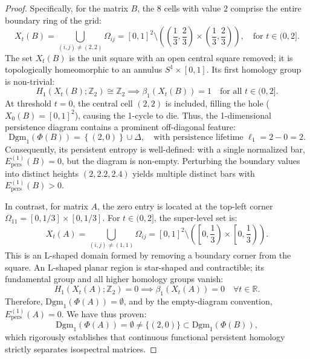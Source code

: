 \documentclass[11pt,a4paper,reqno]{amsart}
\theoremstyle{definition}
\numberwithin{equation}{section}
\newcommand{\R}{\mathbb{R}}
\begin{document}
\begin{proof}
Specifically, for the matrix $B$, the $8$ cells with value $2$ comprise the entire boundary ring of the grid:
\begin{equation}
    X_t(B) = \bigcup_{(i,j) \ne (2,2)} \Omega_{ij} = [0, 1]^2 \setminus \left( \left(\frac{1}{3}, \frac{2}{3}\right) \times \left(\frac{1}{3}, \frac{2}{3}\right) \right), \quad \text{for } t \in (0, 2].
\end{equation}
The set $X_t(B)$ is the unit square with an open central square removed; it is topologically homeomorphic to an annulus $S^1 \times [0, 1]$. Its first homology group is non-trivial:
\begin{equation}
    H_1(X_t(B); \mathbb{Z}_2) \cong \mathbb{Z}_2 \implies \beta_1(X_t(B)) = 1 \quad \text{for all } t \in (0, 2].
\end{equation}
At threshold $t = 0$, the central cell $(2,2)$ is included, filling the hole ($X_0(B) = [0,1]^2$), causing the 1-cycle to die.
Thus, the 1-dimensional persistence diagram contains a prominent off-diagonal feature:
\begin{equation}
    \mathrm{Dgm}_1(\Phi(B)) = \left\{ (2, 0) \right\} \cup \Delta, \quad \text{with persistence lifetime } \ell_1 = 2 - 0 = 2.
\end{equation}
Consequently, its persistent entropy is well-defined: with a single normalized bar, $E_{\mathrm{pers}}^{(1)}(B) = 0$, but the diagram is non-empty. Perturbing the boundary values into distinct heights $(2, 2.2, 2.4)$ yields multiple distinct bars with $E_{\mathrm{pers}}^{(1)}(B) > 0$.

In contrast, for matrix $A$, the zero entry is located at the top-left corner $\Omega_{11} = [0, 1/3] \times [0, 1/3]$. For $t \in (0, 2]$, the super-level set is:
\begin{equation}
    X_t(A) = \bigcup_{(i,j) \ne (1,1)} \Omega_{ij} = [0, 1]^2 \setminus \left( \left[0, \frac{1}{3}\right) \times \left[0, \frac{1}{3}\right) \right).
\end{equation}
This is an L-shaped domain formed by removing a boundary corner from the square. An L-shaped planar region is star-shaped and contractible; its fundamental group and all higher homology groups vanish:
\begin{equation}
    H_1(X_t(A); \mathbb{Z}_2) = 0 \implies \beta_1(X_t(A)) = 0 \quad \forall t \in \R.
\end{equation}
Therefore, $\mathrm{Dgm}_1(\Phi(A)) = \emptyset$, and by the empty-diagram convention, $E_{\mathrm{pers}}^{(1)}(A) = 0$.
We have thus proven:
\begin{equation}
    \mathrm{Dgm}_1(\Phi(A)) = \emptyset \ne \{(2, 0)\} \subset \mathrm{Dgm}_1(\Phi(B)),
\end{equation}
which rigorously establishes that continuous functional persistent homology strictly separates isospectral matrices.
\end{proof}
\end{document}
